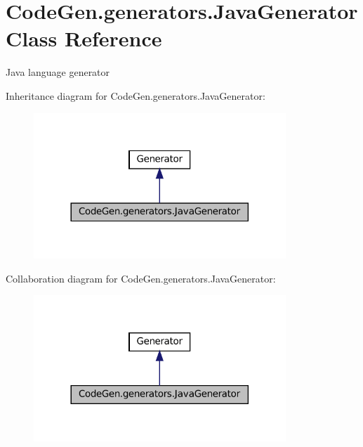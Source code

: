 \hypertarget{classCodeGen_1_1generators_1_1JavaGenerator}{}\section{Code\+Gen.\+generators.\+Java\+Generator Class Reference}
\label{classCodeGen_1_1generators_1_1JavaGenerator}


Java language generator  




Inheritance diagram for Code\+Gen.\+generators.\+Java\+Generator\+:
\nopagebreak
\begin{figure}[H]
\begin{center}
\leavevmode
\includegraphics[width=269pt]{classCodeGen_1_1generators_1_1JavaGenerator__inherit__graph}
\end{center}
\end{figure}


Collaboration diagram for Code\+Gen.\+generators.\+Java\+Generator\+:
\nopagebreak
\begin{figure}[H]
\begin{center}
\leavevmode
\includegraphics[width=269pt]{classCodeGen_1_1generators_1_1JavaGenerator__coll__graph}
\end{center}
\end{figure}

